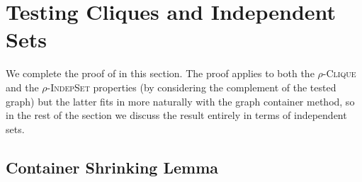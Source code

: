 \documentclass[11pt]{article}
\begin{document}

\section{Testing Cliques and Independent Sets}
\label{sect:testing-IS}
We complete the proof of  in this section. The proof applies to both the \textsc{$\rho$-Clique} and the \textsc{$\rho$-IndepSet} properties (by considering the complement of the tested graph) but the latter fits in more naturally with the graph container method, so in the rest of the section we discuss the result entirely in terms of independent sets. 


\subsection{Container Shrinking Lemma}
\label{sect:containerShrinking}
\end{document}
